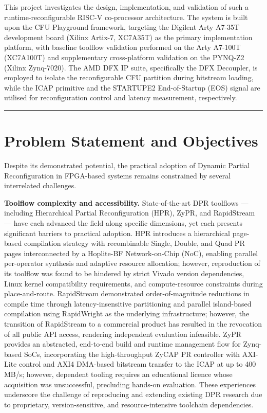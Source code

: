This project investigates the design, implementation, and validation of such a runtime-reconfigurable RISC-V co-processor architecture. The system is built upon the CFU Playground framework, targeting the Digilent Arty A7-35T development board (Xilinx Artix-7, XC7A35T) as the primary implementation platform, with baseline toolflow validation performed on the Arty A7-100T (XC7A100T) and supplementary cross-platform validation on the PYNQ-Z2 (Xilinx Zynq-7020). The AMD DFX IP suite, specifically the DFX Decoupler, is employed to isolate the reconfigurable CFU partition during bitstream loading, while the ICAP primitive and the STARTUPE2 End-of-Startup (EOS) signal are utilised for reconfiguration control and latency measurement, respectively.

\vspace{0.4em}\hrule\vspace{0.4em}

\section{Problem Statement and Objectives}

Despite its demonstrated potential, the practical adoption of Dynamic Partial Reconfiguration in FPGA-based systems remains constrained by several interrelated challenges.

\textbf{Toolflow complexity and accessibility.} State-of-the-art DPR toolflows — including Hierarchical Partial Reconfiguration (HPR), ZyPR, and RapidStream — have each advanced the field along specific dimensions, yet each presents significant barriers to practical adoption. HPR introduces a hierarchical page-based compilation strategy with recombinable Single, Double, and Quad PR pages interconnected by a Hoplite-BF Network-on-Chip (NoC), enabling parallel per-operator synthesis and adaptive resource allocation; however, reproduction of its toolflow was found to be hindered by strict Vivado version dependencies, Linux kernel compatibility requirements, and compute-resource constraints during place-and-route. RapidStream demonstrated order-of-magnitude reductions in compile time through latency-insensitive partitioning and parallel island-based compilation using RapidWright as the underlying infrastructure; however, the transition of RapidStream to a commercial product has resulted in the revocation of all public API access, rendering independent evaluation infeasible. ZyPR provides an abstracted, end-to-end build and runtime management flow for Zynq-based SoCs, incorporating the high-throughput ZyCAP PR controller with AXI-Lite control and AXI4 DMA-based bitstream transfer to the ICAP at up to 400 MB/s; however, dependent tooling requires an educational licence whose acquisition was unsuccessful, precluding hands-on evaluation. These experiences underscore the challenge of reproducing and extending existing DPR research due to proprietary, version-sensitive, and resource-intensive toolchain dependencies.

